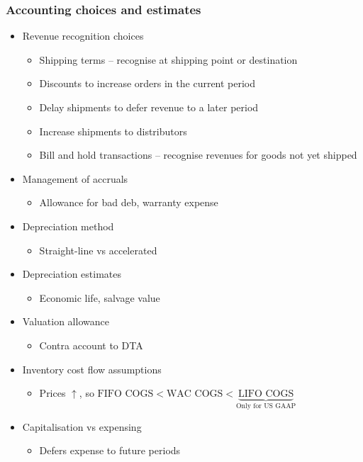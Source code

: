 \documentclass[../notes_compiled.tex]{subfiles}
\begin{document}
\subsubsection{Accounting choices and estimates}
\begin{itemize}
\item Revenue recognition choices
\begin{itemize}
\item Shipping terms -- recognise at shipping point or destination
\item Discounts to increase orders in the current period
\item Delay shipments to defer revenue to a later period
\item Increase shipments to distributors
\item Bill and hold transactions -- recognise revenues for goods not yet shipped
\end{itemize}

\item Management of accruals
\begin{itemize}
\item Allowance for bad deb, warranty expense
\end{itemize}

\item Depreciation method
\begin{itemize}
\item Straight-line vs accelerated
\end{itemize}

\item Depreciation estimates
\begin{itemize}
\item Economic life, salvage value
\end{itemize}

\item Valuation allowance
\begin{itemize}
\item Contra account to DTA
\end{itemize}

\item Inventory cost flow assumptions
\begin{itemize}
\item Prices $\uparrow$, so $\text{FIFO COGS} < \text{WAC COGS} < \underbrace{\text{LIFO COGS}}_{\text{Only for US GAAP}}$
\end{itemize}

\item Capitalisation vs expensing
\begin{itemize}
\item Defers expense to future periods
\end{itemize}


\end{itemize}
\end{document}
